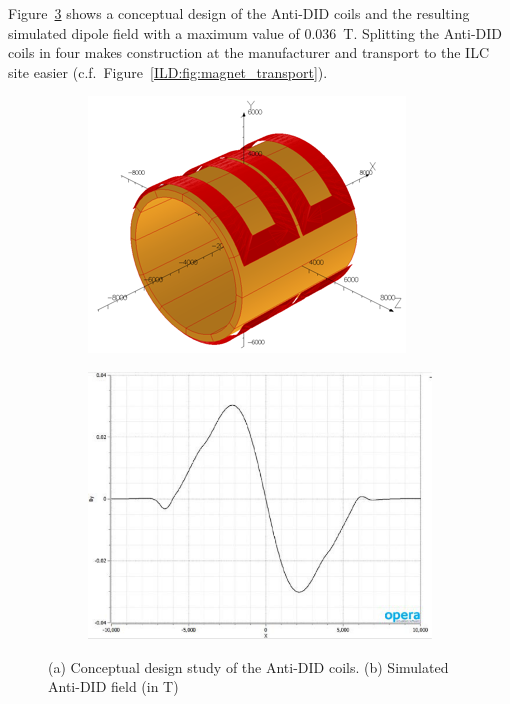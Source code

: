  Figure~\ref{ILD:fig:anti_did_design} shows a conceptual design of the Anti-DID coils and the resulting simulated dipole field with a maximum value of 0.036~T. Splitting the Anti-DID coils in four makes construction at the manufacturer and transport to the ILC site easier (c.f.~Figure~\ref{ILD:fig:magnet_transport}).

\begin{figure}[h!]
\begin{subfigure}{0.49\hsize} \includegraphics[width=\textwidth]{Integration/fig/Anti-DID.png}
\caption{ \label{ild:fig:anti_did_mechanics}}
 \end{subfigure}
\begin{subfigure}{0.49\hsize} \includegraphics[width=\textwidth]{Integration/fig/Anti-DID_Field.pdf}
\caption{  \label{ild:fig:anti-did-field}}
 \end{subfigure}
\caption{(a) Conceptual design study of the Anti-DID coils. (b) Simulated Anti-DID field (in T)~\cite{ild:bib:anti-did-design}}
\label{ILD:fig:anti_did_design}
\end{figure}

